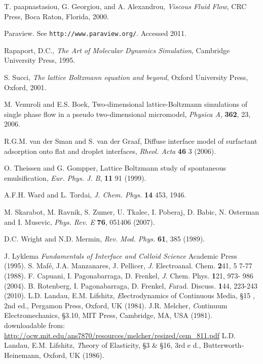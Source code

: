 \begin{thebibliography}{99}
T. paapnastasiou, G. Georgiou, and A. Alexandrou,
\textit{Viscous Fluid Flow},
CRC Press, Boca Raton, Florida, 2000.

Paraview. See \texttt{http://www.paraview.org/}. Accessed 2011.

Rapaport, D.C., \textit{The Art of Molecular Dynamics Simulation},
Cambridge University Press, 1995.

S. Succi, \textit{The lattice Boltzmann equation and beyond},
Oxford University Press, Oxford, 2001.

M. Venuroli and E.S. Boek,
Two-dimensional lattice-Boltzmann simulations of single phase
flow in a pseudo two-dimensional micromodel,
\textit{Physica A}, \textbf{362}, 23, 2006.

R.G.M. van der Sman and S. van der Graaf,
Diffuse interface model of surfactant adsorption onto flat and
droplet interfaces,
\textit{Rheol. Acta} \textbf{46} 3 (2006).

O. Theissen and G. Gompper,
Lattice Boltzmann study of spontaneous emulsification,
\textit{Eur. Phys. J. B}, \textbf{11} 91 (1999).

A.F.H. Ward and L. Tordai,
\textit{J. Chem. Phys.} \textbf{14} 453, 1946.

M. Skarabot, M. Ravnik, S. Zumer, U. Tkalec, I. Poberaj, D. Babic, N. Osterman and I. Musevic,
\textit{Phys. Rev. E} \textbf{76}, 051406 (2007).

D.C. Wright and N.D. Mermin,
\textit{Rev. Mod. Phys.} \textbf{61}, 385 (1989).

 J. Lyklema {\em Fundamentals of Interface and Colloid Science} Academic Press     (1995).
 S. Maf\'e, J.A. Manzanares, J. Pellicer, {\textit J. Electroanal. Chem.} {\textbf 241}, 5    7-77 (1988).
 F. Capuani, I. Pagonabarraga, D. Frenkel, {\textit J. Chem. Phys.} {\textbf 121}, 973-    986 (2004).
 B. Rotenberg, I. Pagonabarraga, D. Frenkel, {\textit Farad. Discuss.} {\textbf 144},     223-243 (2010).
 L.D. Landau, E.M. Lifshitz, {\textit Electrodynamics of Continuous Media}, \S 15    , 2nd ed., Pergamon Press, Oxford, UK (1984).
 J.R. Melcher, {\textit Continuum Electromechanics}, \S 3.10, MIT Press, Cambridge,     MA, USA (1981).\\
downloadable from:\\
\url{http://ocw.mit.edu/ans7870/resources/melcher/resized/cem_811.pdf}
 L.D. Landau, E.M. Lifshitz, {\textit Theory of Elasticity}, \S 3 \& \S 16, 3rd e    d., Butterworth-Heinemann, Oxford, UK (1986).



\end{thebibliography}


